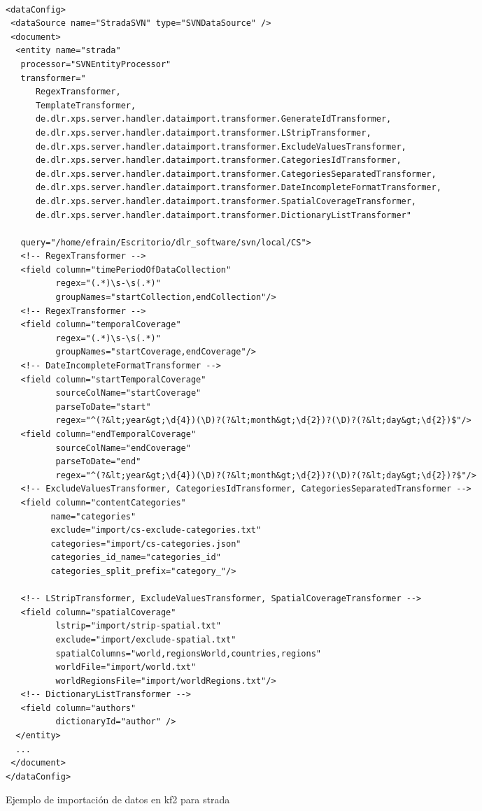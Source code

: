 \begin{listing}[H]
\begin{verbatim}
                
<dataConfig>
 <dataSource name="StradaSVN" type="SVNDataSource" />
 <document>
  <entity name="strada" 
   processor="SVNEntityProcessor"
   transformer="
      RegexTransformer,
      TemplateTransformer,
      de.dlr.xps.server.handler.dataimport.transformer.GenerateIdTransformer,
      de.dlr.xps.server.handler.dataimport.transformer.LStripTransformer,
      de.dlr.xps.server.handler.dataimport.transformer.ExcludeValuesTransformer,
      de.dlr.xps.server.handler.dataimport.transformer.CategoriesIdTransformer,
      de.dlr.xps.server.handler.dataimport.transformer.CategoriesSeparatedTransformer,
      de.dlr.xps.server.handler.dataimport.transformer.DateIncompleteFormatTransformer,
      de.dlr.xps.server.handler.dataimport.transformer.SpatialCoverageTransformer,
      de.dlr.xps.server.handler.dataimport.transformer.DictionaryListTransformer"
   
   query="/home/efrain/Escritorio/dlr_software/svn/local/CS">
   <!-- RegexTransformer -->
   <field column="timePeriodOfDataCollection"
          regex="(.*)\s-\s(.*)" 
          groupNames="startCollection,endCollection"/>
   <!-- RegexTransformer -->
   <field column="temporalCoverage" 
   		  regex="(.*)\s-\s(.*)" 
          groupNames="startCoverage,endCoverage"/>
   <!-- DateIncompleteFormatTransformer -->
   <field column="startTemporalCoverage" 
          sourceColName="startCoverage" 
          parseToDate="start" 
          regex="^(?&lt;year&gt;\d{4})(\D)?(?&lt;month&gt;\d{2})?(\D)?(?&lt;day&gt;\d{2})$"/>
   <field column="endTemporalCoverage" 
          sourceColName="endCoverage" 
          parseToDate="end" 
          regex="^(?&lt;year&gt;\d{4})(\D)?(?&lt;month&gt;\d{2})?(\D)?(?&lt;day&gt;\d{2})?$"/>
   <!-- ExcludeValuesTransformer, CategoriesIdTransformer, CategoriesSeparatedTransformer -->
   <field column="contentCategories" 
         name="categories" 
         exclude="import/cs-exclude-categories.txt" 
         categories="import/cs-categories.json" 
         categories_id_name="categories_id" 
         categories_split_prefix="category_"/>
   
   <!-- LStripTransformer, ExcludeValuesTransformer, SpatialCoverageTransformer -->
   <field column="spatialCoverage" 
          lstrip="import/strip-spatial.txt" 
          exclude="import/exclude-spatial.txt"
          spatialColumns="world,regionsWorld,countries,regions"
          worldFile="import/world.txt" 
          worldRegionsFile="import/worldRegions.txt"/>
   <!-- DictionaryListTransformer -->
   <field column="authors" 
          dictionaryId="author" />
  </entity>
  ...
 </document>
</dataConfig>
	\end{verbatim}
	\caption{Ejemplo de importación de datos en \gls{kf2} para \gls{strada}}
	\label{code:import}
\end{listing}

